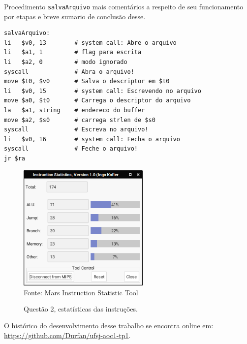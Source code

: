 \documentclass[12pt,a4paper]{article}
\numberwithin{figure}{section}
\begin{document}
Procedimento \texttt{salvaArquivo} mais comentários a respeito de seu funcionamento por etapas e breve sumario de conclusão desse.

\vspace{-0.5cm}
\begin{lstlisting}[caption={salvaArquivo}]
salvaArquivo:
li   $v0, 13        # system call: Abre o arquivo
li   $a1, 1         # flag para escrita
li   $a2, 0         # modo ignorado
syscall             # Abra o arquivo!
move $t0, $v0       # Salva o descriptor em $t0 
li   $v0, 15        # system call: Escrevendo no arquivo
move $a0, $t0       # Carrega o descriptor do arquivo 
la   $a1, string    # endereco do buffer
move $a2, $s0       # carrega strlen de $s0
syscall             # Escreva no arquivo!
li   $v0, 16        # system call: Fecha o arquivo
syscall             # Feche o arquivo!
jr $ra
\end{lstlisting}

\lipsum[1]

\begin{figure}[H]
	\centering
	\caption{Questão 2, estatísticas das instruções.}
	\vspace{0.2cm}
	\includegraphics[width=242px]{questao2_stats}
	\\\footnotesize Fonte: Mars Instruction Statistic Tool
\end{figure}


\pagebreak

\begin{flushleft}
	\nocite{*}
	
	\vfill
	O histórico do desenvolvimento desse trabalho se encontra online em:\\ \url{https://github.com/Durfan/ufsj-aoc1-tp1}.
\end{flushleft}
\end{document}
